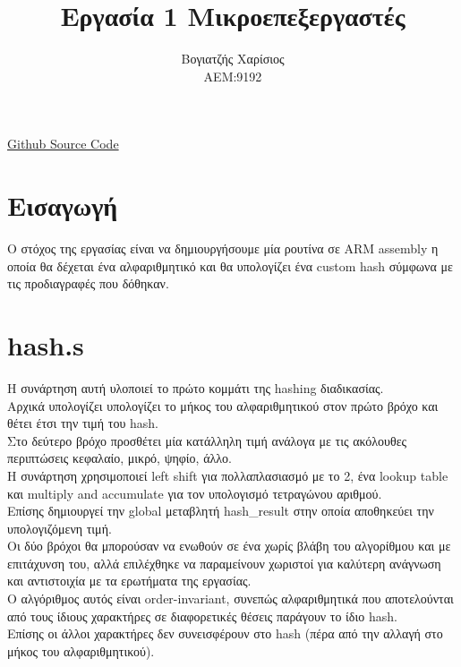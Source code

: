 \documentclass{article}
\title{Εργασία 1 Μικροεπεξεργαστές}
\author{Βογιατζής Χαρίσιος \\ ΑΕΜ:9192}
\begin{document}
\maketitle

\href{https://github.com/charisvt/micro-lab1}{Github Source Code} \\

\section{Εισαγωγή}
Ο στόχος της εργασίας είναι να δημιουργήσουμε μία ρουτίνα σε ARM assembly η οποία θα δέχεται ένα αλφαριθμητικό και θα υπολογίζει ένα custom hash σύμφωνα με τις προδιαγραφές που δόθηκαν. \\

\section{hash.s}
Η συνάρτηση αυτή υλοποιεί το πρώτο κομμάτι της hashing διαδικασίας. \\
Αρχικά υπολογίζει υπολογίζει το μήκος του αλφαριθμητικού στον πρώτο βρόχο και θέτει έτσι την τιμή του hash. \\
Στο δεύτερο βρόχο προσθέτει μία κατάλληλη τιμή ανάλογα με τις ακόλουθες περιπτώσεις {κεφαλαίο, μικρό, ψηφίο, άλλο}. \\
Η συνάρτηση χρησιμοποιεί left shift για πολλαπλασιασμό με το 2, ένα lookup table και multiply and accumulate για τον υπολογισμό τετραγώνου αριθμού. \\
Επίσης δημιουργεί την global μεταβλητή hash\_result στην οποία αποθηκεύει την υπολογιζόμενη τιμή.\\
Οι δύο βρόχοι θα μπορούσαν να ενωθούν σε ένα χωρίς βλάβη του αλγορίθμου και με επιτάχυνση του, αλλά επιλέχθηκε να παραμείνουν χωριστοί για καλύτερη ανάγνωση και αντιστοιχία με τα ερωτήματα της εργασίας. \\
Ο αλγόριθμος αυτός είναι order-invariant, συνεπώς αλφαριθμητικά που αποτελούνται από τους ίδιους χαρακτήρες σε διαφορετικές θέσεις παράγουν το ίδιο hash. \\
Επίσης οι άλλοι χαρακτήρες δεν συνεισφέρουν στο hash (πέρα από την αλλαγή στο μήκος του αλφαριθμητικού).
\end{document}
